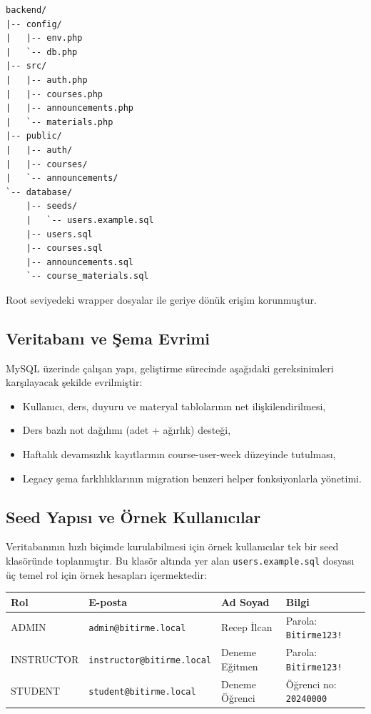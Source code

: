 \documentclass[12pt,a4paper]{article}
\begin{document}
\begin{lstlisting}[basicstyle=\ttfamily\small]
backend/
|-- config/
|   |-- env.php
|   `-- db.php
|-- src/
|   |-- auth.php
|   |-- courses.php
|   |-- announcements.php
|   `-- materials.php
|-- public/
|   |-- auth/
|   |-- courses/
|   `-- announcements/
`-- database/
    |-- seeds/
    |   `-- users.example.sql
    |-- users.sql
    |-- courses.sql
    |-- announcements.sql
    `-- course_materials.sql
\end{lstlisting}

Root seviyedeki wrapper dosyalar ile geriye dönük erişim korunmuştur.

\subsection{Veritabanı ve Şema Evrimi}
MySQL üzerinde çalışan yapı, geliştirme sürecinde aşağıdaki gereksinimleri karşılayacak şekilde evrilmiştir:

\begin{itemize}[leftmargin=*]
    \item Kullanıcı, ders, duyuru ve materyal tablolarının net ilişkilendirilmesi,
    \item Ders bazlı not dağılımı (adet + ağırlık) desteği,
    \item Haftalık devamsızlık kayıtlarının course-user-week düzeyinde tutulması,
    \item Legacy şema farklılıklarının migration benzeri helper fonksiyonlarla yönetimi.
\end{itemize}

\subsection{Seed Yapısı ve Örnek Kullanıcılar}
Veritabanının hızlı biçimde kurulabilmesi için örnek kullanıcılar tek bir seed klasöründe toplanmıştır. Bu klasör altında yer alan \texttt{users.example.sql} dosyası üç temel rol için örnek hesapları içermektedir:

\begin{table}[H]
\centering
\begin{tabular}{@{}llll@{}}
\toprule
\textbf{Rol} & \textbf{E-posta} & \textbf{Ad Soyad} & \textbf{Bilgi} \\
\midrule
ADMIN & \texttt{admin@bitirme.local} & Recep İlcan & Parola: \texttt{Bitirme123!} \\
INSTRUCTOR & \texttt{instructor@bitirme.local} & Deneme Eğitmen & Parola: \texttt{Bitirme123!} \\
STUDENT & \texttt{student@bitirme.local} & Deneme Öğrenci & Öğrenci no: \texttt{20240000} \\
\bottomrule
\end{tabular}
\end{table}
\end{document}
